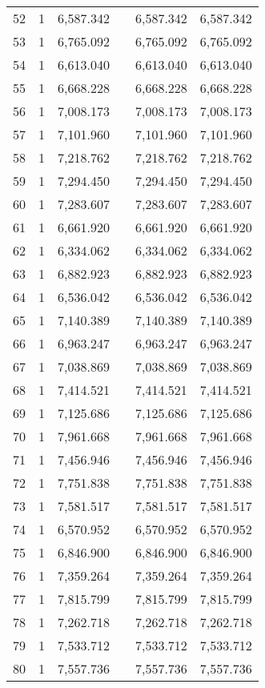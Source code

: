\begin{table}[!htbp]
\begin{tabular}{@{\extracolsep{5pt}}lccccc}
52 & 1 & 6,587.342 &  & 6,587.342 & 6,587.342 \\ 
53 & 1 & 6,765.092 &  & 6,765.092 & 6,765.092 \\ 
54 & 1 & 6,613.040 &  & 6,613.040 & 6,613.040 \\ 
55 & 1 & 6,668.228 &  & 6,668.228 & 6,668.228 \\ 
56 & 1 & 7,008.173 &  & 7,008.173 & 7,008.173 \\ 
57 & 1 & 7,101.960 &  & 7,101.960 & 7,101.960 \\ 
58 & 1 & 7,218.762 &  & 7,218.762 & 7,218.762 \\ 
59 & 1 & 7,294.450 &  & 7,294.450 & 7,294.450 \\ 
60 & 1 & 7,283.607 &  & 7,283.607 & 7,283.607 \\ 
61 & 1 & 6,661.920 &  & 6,661.920 & 6,661.920 \\ 
62 & 1 & 6,334.062 &  & 6,334.062 & 6,334.062 \\ 
63 & 1 & 6,882.923 &  & 6,882.923 & 6,882.923 \\ 
64 & 1 & 6,536.042 &  & 6,536.042 & 6,536.042 \\ 
65 & 1 & 7,140.389 &  & 7,140.389 & 7,140.389 \\ 
66 & 1 & 6,963.247 &  & 6,963.247 & 6,963.247 \\ 
67 & 1 & 7,038.869 &  & 7,038.869 & 7,038.869 \\ 
68 & 1 & 7,414.521 &  & 7,414.521 & 7,414.521 \\ 
69 & 1 & 7,125.686 &  & 7,125.686 & 7,125.686 \\ 
70 & 1 & 7,961.668 &  & 7,961.668 & 7,961.668 \\ 
71 & 1 & 7,456.946 &  & 7,456.946 & 7,456.946 \\ 
72 & 1 & 7,751.838 &  & 7,751.838 & 7,751.838 \\ 
73 & 1 & 7,581.517 &  & 7,581.517 & 7,581.517 \\ 
74 & 1 & 6,570.952 &  & 6,570.952 & 6,570.952 \\ 
75 & 1 & 6,846.900 &  & 6,846.900 & 6,846.900 \\ 
76 & 1 & 7,359.264 &  & 7,359.264 & 7,359.264 \\ 
77 & 1 & 7,815.799 &  & 7,815.799 & 7,815.799 \\ 
78 & 1 & 7,262.718 &  & 7,262.718 & 7,262.718 \\ 
79 & 1 & 7,533.712 &  & 7,533.712 & 7,533.712 \\ 
80 & 1 & 7,557.736 &  & 7,557.736 & 7,557.736 \\ 

\end{tabular}
\end{table}
